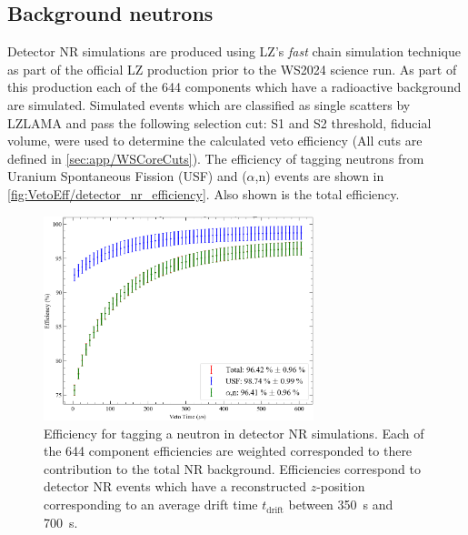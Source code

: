 \subsection{Background neutrons}\label{sec:VetoEff/BackgroundNeutrons}
Detector NR simulations are produced using LZ's \textit{fast} chain simulation technique as part of the official LZ production prior to the WS2024 science run.
As part of this production each of the 644 components which have a radioactive background are simulated.
Simulated events which are classified as single scatters by LZLAMA and pass the following selection cut: S1 and S2 threshold, fiducial volume, were used to determine the calculated veto efficiency (All cuts are defined in \autoref{sec:app/WSCoreCuts}).
The efficiency of tagging neutrons from Uranium Spontaneous Fission (USF) and ($\alpha$,n) events are shown in \autoref{fig:VetoEff/detector_nr_efficiency}. Also shown is the total efficiency.

\begin{figure}[!ht]
	\centering
	\includegraphics[width=0.7\textwidth]{figures/VetoEfficiency/det_nr_efficiency.png}
	\caption{Efficiency for tagging a neutron in detector NR simulations. Each of the 644 component efficiencies are weighted corresponded to there contribution to the total NR background. Efficiencies correspond to detector NR events which have a reconstructed $z$-position corresponding to an average drift time $t_\text{drift}$ between 350~\textmu s and 700~\textmu s.}
	\label{fig:VetoEff/detector_nr_efficiency}
\end{figure}

